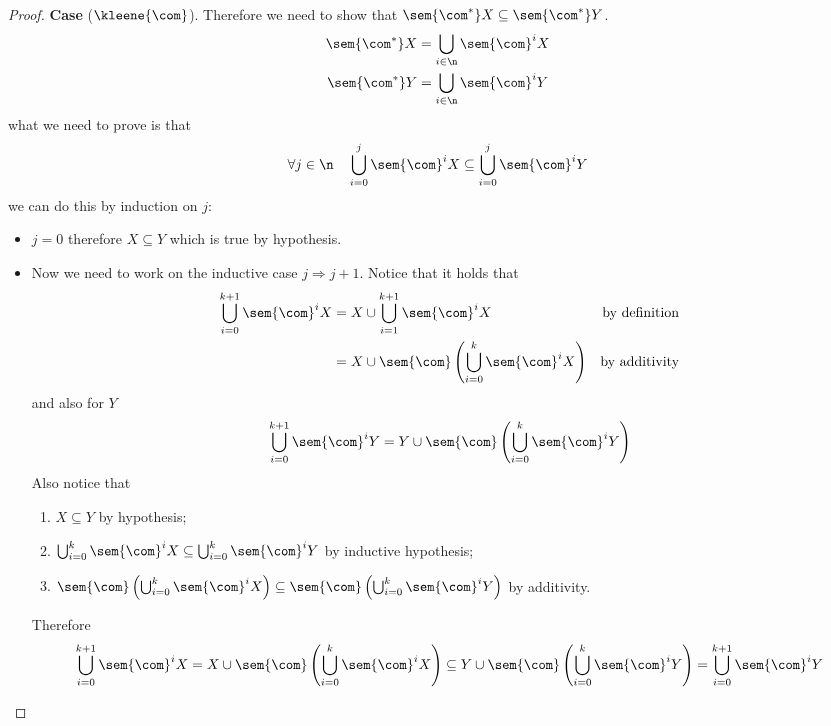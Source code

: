 \begin{proof}
  \noindent
  \textbf{Case} (\(\kleene{\com}\)). Therefore we need to show
  that \(\sem{\com^*}X \subseteq \sem{\com^*}Y \).
  \begin{align*}
    \sem{\com^*}X & = \bigcup_{i\in\n}\sem{\com}^i X \\
    \sem{\com^*}Y & = \bigcup_{i\in\n}\sem{\com}^i Y
  \end{align*}
  what we need to prove is that
  \[\forall j \in \n \quad \bigcup_{i=0}^j\sem{\com}^i X \subseteq
    \bigcup_{i=0}^j\sem{\com}^i Y\]
  we can do this by induction on \(j\):
  \begin{itemize}
  \item \(j=0\) therefore \(X\subseteq Y\) which is true by
    hypothesis.
  \item Now we need to work on the inductive case
    \(j \Rightarrow j+1\). Notice that it holds that
    \begin{align*}
      \bigcup_{i=0}^{k+1}\sem{\com}^i X & = X \cup \bigcup_{i=1}^{k+1}\sem{\com}^i X & \text{by definition} \\
                                        & = X \cup \sem{\com}\left(\bigcup_{i=0}^{k}\sem{\com}^i X\right) & \text{by additivity}
    \end{align*}
    and also for \(Y\)
    \begin{equation*}
      \bigcup_{i=0}^{k+1}\sem{\com}^i Y = Y \cup \sem{\com}\left(\bigcup_{i=0}^{k}\sem{\com}^i Y\right)
    \end{equation*}
    Also notice that
    \begin{enumerate}[label=(\roman*)]
    \item \(X \subseteq Y\) by hypothesis;
    \item
      \(\bigcup_{i=0}^{k}\sem{\com}^i X \subseteq
      \bigcup_{i=0}^{k}\sem{\com}^i Y\) by inductive hypothesis;
    \item 
      \(\sem{\com}\left(\bigcup_{i=0}^{k}\sem{\com}^i X\right)
      \subseteq \sem{\com}\left(\bigcup_{i=0}^{k}\sem{\com}^i
        Y\right)\) by additivity.
    \end{enumerate}
    Therefore
    \[\bigcup_{i=0}^{k+1}\sem{\com}^i X = X \cup
      \sem{\com}\left(\bigcup_{i=0}^{k}\sem{\com}^i X\right)
      \subseteq Y \cup \sem{\com}\left(\bigcup_{i=0}^{k}\sem{\com}^i
        Y\right) = \bigcup_{i=0}^{k+1}\sem{\com}^i Y \]
  \end{itemize}
\end{proof}

